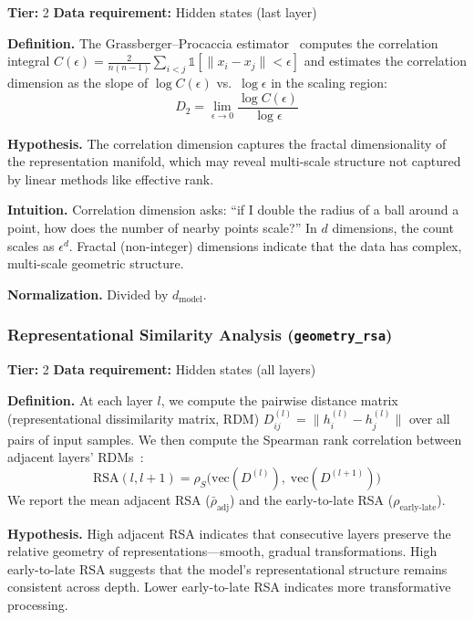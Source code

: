 \documentclass[preprint]{neurips_2025}
\begin{document}
\textbf{Tier:} 2 \quad \textbf{Data requirement:} Hidden states (last layer)

\textbf{Definition.}
The Grassberger--Procaccia estimator~\citep{grassberger1983measuring} computes the correlation integral $C(\epsilon) = \frac{2}{n(n-1)} \sum_{i<j} \mathds{1}[\|x_i - x_j\| < \epsilon]$ and estimates the correlation dimension as the slope of $\log C(\epsilon)$ vs.\ $\log \epsilon$ in the scaling region:
\begin{equation}
  D_2 = \lim_{\epsilon \to 0} \frac{\log C(\epsilon)}{\log \epsilon}
\end{equation}

\textbf{Hypothesis.}
The correlation dimension captures the fractal dimensionality of the representation manifold, which may reveal multi-scale structure not captured by linear methods like effective rank.

\textbf{Intuition.}
Correlation dimension asks: ``if I double the radius of a ball around a point, how does the number of nearby points scale?'' In $d$ dimensions, the count scales as $\epsilon^d$. Fractal (non-integer) dimensions indicate that the data has complex, multi-scale geometric structure.

\textbf{Normalization.} Divided by $d_{\text{model}}$.

\subsubsection{Representational Similarity Analysis (\texttt{geometry\_rsa})}
\label{app:rsa}

\textbf{Tier:} 2 \quad \textbf{Data requirement:} Hidden states (all layers)

\textbf{Definition.}
At each layer $l$, we compute the pairwise distance matrix (representational dissimilarity matrix, RDM) $D^{(l)}_{ij} = \|h_i^{(l)} - h_j^{(l)}\|$ over all pairs of input samples. We then compute the Spearman rank correlation between adjacent layers' RDMs~\citep{kriegeskorte2008representational}:
\begin{equation}
  \text{RSA}(l, l+1) = \rho_S\!\bigl(\text{vec}(D^{(l)}),\; \text{vec}(D^{(l+1)})\bigr)
\end{equation}
We report the mean adjacent RSA ($\bar\rho_{\text{adj}}$) and the early-to-late RSA ($\rho_{\text{early-late}}$).

\textbf{Hypothesis.}
High adjacent RSA indicates that consecutive layers preserve the relative geometry of representations---smooth, gradual transformations. High early-to-late RSA suggests that the model's representational structure remains consistent across depth. Lower early-to-late RSA indicates more transformative processing.
\end{document}
